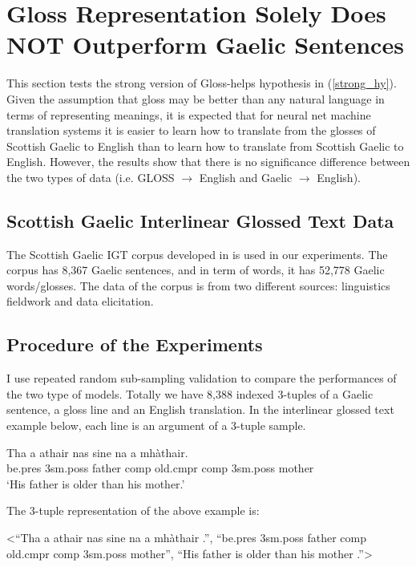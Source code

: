 \documentclass[11pt,a4paper]{article}
\begin{document}
\section{Gloss Representation Solely Does NOT Outperform Gaelic Sentences} \label{gd_to_gl_to_en}
This section tests the strong version of Gloss-helps hypothesis in (\ref{strong_hy}).
Given the assumption that gloss may be better than any natural language in terms of representing meanings, it is expected that for neural net machine translation systems it is easier to learn how to translate from the glosses of Scottish Gaelic to English than to learn how to translate from Scottish Gaelic to English. However, the results show that there is no significance difference between the two types of data (i.e. GLOSS $\rightarrow$ English and Gaelic $\rightarrow$ English).

\subsection{Scottish Gaelic Interlinear Glossed Text Data}
The Scottish Gaelic IGT corpus developed in \citet{gaelic_igt} is used in our experiments. 
The corpus has 8,367 Gaelic sentences, and in term of words, it has 52,778 Gaelic words/glosses. The data of the corpus is from two different sources: linguistics fieldwork and data elicitation.

\subsection{Procedure of the Experiments}
I use repeated random sub-sampling validation to compare the performances of the two type of models.
Totally we have 8,388 indexed 3-tuples of a Gaelic sentence, a gloss line and an English translation. In the interlinear glossed text example below, each line is an argument of a 3-tuple sample.

\begin{exe} 
\ex \gll    Tha a athair nas sine na a mh\`athair.\\ 
           be.pres 3sm.poss father comp old.cmpr comp 3sm.poss mother
\\ 
   \glt    `His father is older than his mother.' 
\end{exe}

The 3-tuple representation of the above example is:
\begin{exe}
\ex <``Tha a athair nas sine na a mh\`athair .'', ``be.pres 3sm.poss father comp old.cmpr comp 3sm.poss mother'', ``His father is older than his mother .''>
\end{exe}
\end{document}
